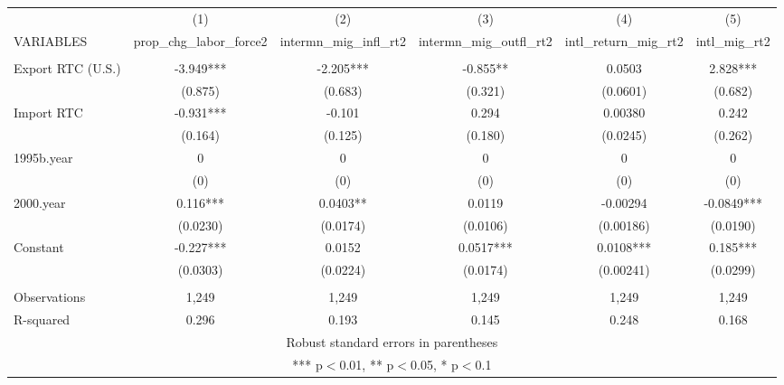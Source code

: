\begin{tabular}{lccccc} \hline
 & (1) & (2) & (3) & (4) & (5) \\
VARIABLES & prop\_chg\_labor\_force2 & intermn\_mig\_infl\_rt2 & intermn\_mig\_outfl\_rt2 & intl\_return\_mig\_rt2 & intl\_mig\_rt2 \\ \hline
 &  &  &  &  &  \\
Export RTC (U.S.) & -3.949*** & -2.205*** & -0.855** & 0.0503 & 2.828*** \\
 & (0.875) & (0.683) & (0.321) & (0.0601) & (0.682) \\
Import RTC & -0.931*** & -0.101 & 0.294 & 0.00380 & 0.242 \\
 & (0.164) & (0.125) & (0.180) & (0.0245) & (0.262) \\
1995b.year & 0 & 0 & 0 & 0 & 0 \\
 & (0) & (0) & (0) & (0) & (0) \\
2000.year & 0.116*** & 0.0403** & 0.0119 & -0.00294 & -0.0849*** \\
 & (0.0230) & (0.0174) & (0.0106) & (0.00186) & (0.0190) \\
Constant & -0.227*** & 0.0152 & 0.0517*** & 0.0108*** & 0.185*** \\
 & (0.0303) & (0.0224) & (0.0174) & (0.00241) & (0.0299) \\
 &  &  &  &  &  \\
Observations & 1,249 & 1,249 & 1,249 & 1,249 & 1,249 \\
 R-squared & 0.296 & 0.193 & 0.145 & 0.248 & 0.168 \\ \hline
\multicolumn{6}{c}{ Robust standard errors in parentheses} \\
\multicolumn{6}{c}{ *** p$<$0.01, ** p$<$0.05, * p$<$0.1} \\
\end{tabular}
